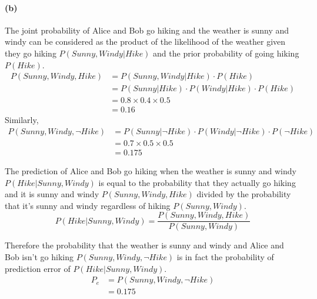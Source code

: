 \documentclass[a4paper]{article}
\begin{document}
\paragraph{(b)} The joint probability of Alice and Bob go hiking and the weather is sunny and windy can be considered as the product of the likelihood of the weather given they go hiking $P(Sunny, Windy | Hike)$ and the prior probability of going hiking $P(Hike)$.\\
	\begin{align}
		P(Sunny, Windy, Hike) &= P(Sunny, Windy | Hike) \cdot P(Hike)\\
			&= P(Sunny | Hike) \cdot P(Windy | Hike) \cdot P(Hike)\\
			&= 0.8 \times 0.4 \times 0.5\\
			&= 0.16
	\end{align}
	Similarly,
	\begin{align}
		P(Sunny, Windy, \neg Hike) &= P(Sunny | \neg Hike) \cdot P(Windy | \neg Hike) \cdot P(\neg Hike)\\
			&= 0.7 \times 0.5 \times 0.5\\
			&= 0.175
	\end{align}
	
	The prediction of Alice and Bob go hiking when the weather is sunny and windy $P(Hike|Sunny, Windy)$ is equal to the probability that they actually go hiking and it is sunny and windy $P(Sunny, Windy, Hike)$ divided by the probability that it's sunny and windy regardless of hiking $P(Sunny, Windy)$.
	$$ P(Hike|Sunny, Windy) = \frac{P(Sunny, Windy, Hike)}{P(Sunny, Windy)} $$
	
	Therefore the probability that the weather is sunny and windy and Alice and Bob isn't go hiking $P(Sunny, Windy, \neg Hike)$ is in fact the probability of prediction error of $P(Hike|Sunny, Windy)$. 
	\begin{align}
		P_e &= P(Sunny, Windy,\neg Hike) \\
			&= 0.175
	\end{align}
	
\end{document}
